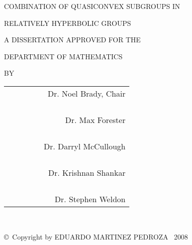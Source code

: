 \documentclass[12pt]{report}
\theoremstyle{definition}
\theoremstyle{remark}
\numberwithin{equation}{chapter}
\numberwithin{figure}{chapter}
\begin{document}
{{%
\newpage
\thispagestyle{empty}
\begin{center}
{%
COMBINATION OF QUASICONVEX SUBGROUPS IN
\par
RELATIVELY HYPERBOLIC GROUPS
\par
\vspace{0.9in}
A DISSERTATION APPROVED FOR THE
\par
DEPARTMENT OF MATHEMATICS
\par
\vspace{0.9in}
BY
\par
\vfill
\begin{flushright}
\begin{tabular}{cr}
\hline
\  \  \  \  \  \  \  & Dr. Noel Brady, Chair\\
 \\ &  \\
  \\ &  \\
\hline
  & Dr. Max Forester \\
\\ & \\
 \\ &  \\
\hline
 & Dr. Darryl McCullough \\
\\   & \\
 \\ &  \\
\hline
 & Dr. Krishnan Shankar \\
 \\ &  \\
  \\ &  \\
\hline
   & Dr. Stephen Weldon \\
\end{tabular}
\end{flushright}
}
\end{center}


\newpage
\thispagestyle{empty}
\   \
\par
\vfill
\begin{center}
\copyright \    Copyright by EDUARDO MARTINEZ PEDROZA \   2008


\end{center}}}
\end{document}
